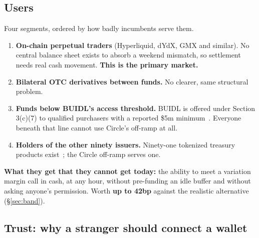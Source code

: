 \documentclass[11pt,a4paper]{article}
\begin{document}
\subsection{Users}

Four segments, ordered by how badly incumbents serve them.

\begin{enumerate}
  \item \textbf{On-chain perpetual traders} (Hyperliquid, dYdX, GMX and similar). No central balance
  sheet exists to absorb a weekend mismatch, so settlement needs real cash movement. \textbf{This is
  the primary market.}
  \item \textbf{Bilateral OTC derivatives between funds.} No clearer, same structural problem.
  \item \textbf{Funds below BUIDL's access threshold.} BUIDL is offered under Section 3(c)(7) to
  qualified purchasers with a reported \$5m minimum~\cite{ecokyc,coinpaprika}. Everyone beneath that
  line cannot use Circle's off-ramp at all.
  \item \textbf{Holders of the other ninety issuers.} Ninety-one tokenized treasury products
  exist~\cite{allium}; the Circle off-ramp serves one.
\end{enumerate}

\textbf{What they get that they cannot get today:} the ability to meet a variation margin call in
cash, at any hour, without pre-funding an idle buffer and without asking anyone's permission. Worth
\textbf{up to 42bp} against the realistic alternative (\S\ref{sec:band}).

\subsection{Trust: why a stranger should connect a wallet}
\end{document}
